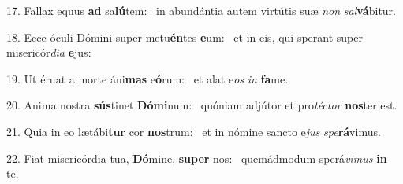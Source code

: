 17. Fallax equus \textbf{ad} sa\textbf{lú}tem: \ast\  in abundántia autem virtútis suæ \textit{non} \textit{sal}\textbf{vá}bitur.\

18. Ecce óculi Dómini super metu\textbf{én}tes \textbf{e}um: \ast\  et in eis, qui sperant super misericór\textit{di}\textit{a} \textbf{e}jus:\

19. Ut éruat a morte áni\textbf{mas} e\textbf{ó}rum: \ast\  et alat e\textit{os} \textit{in} \textbf{fa}me.\

20. Anima nostra \textbf{sús}tinet \textbf{Dó}\textbf{mi}num: \ast\  quóniam adjútor et pro\textit{téc}\textit{tor} \textbf{nos}ter est.\

21. Quia in eo lætábi\textbf{tur} cor \textbf{nos}trum: \ast\  et in nómine sancto e\textit{jus} \textit{spe}\textbf{rá}vimus.\

22. Fiat misericórdia tua, \textbf{Dó}mine, \textbf{su}\textbf{per} nos: \ast\  quemádmodum sperá\textit{vi}\textit{mus} \textbf{in} te.\

